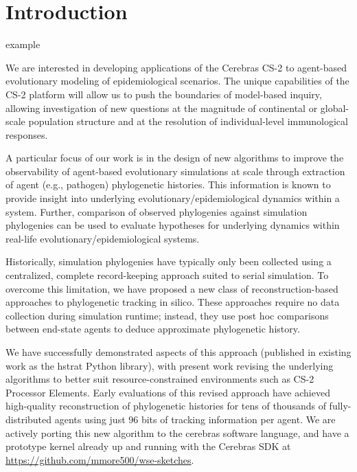 \section{Introduction} \label{sec:introduction}

example \citep{gagliardi2019international}




We are interested in developing applications of the Cerebras CS-2 to agent-based evolutionary modeling of epidemiological scenarios.
The unique capabilities of the CS-2 platform will allow us to push the boundaries of model-based inquiry, allowing investigation of new questions at the magnitude of continental or global-scale population structure and at the resolution of individual-level immunological responses.

A particular focus of our work is in the design of new algorithms to improve the observability of agent-based evolutionary simulations at scale through extraction of agent (e.g., pathogen) phylogenetic histories.
This information is known to provide insight into underlying evolutionary/epidemiological dynamics within a system.
Further, comparison of observed phylogenies against simulation phylogenies can be used to evaluate hypotheses for underlying dynamics within real-life evolutionary/epidemiological systems.

Historically, simulation phylogenies have typically only been collected using a centralized, complete record-keeping approach suited to serial simulation.
To overcome this limitation, we have proposed a new class of reconstruction-based approaches to phylogenetic tracking in silico.
These approaches require no data collection during simulation runtime; instead, they use post hoc comparisons between end-state agents to deduce approximate phylogenetic history.

We have successfully demonstrated aspects of this approach (published in existing work as the hstrat Python library), with present work revising the underlying algorithms to better suit resource-constrained environments such as CS-2 Processor Elements.
Early evaluations of this revised approach have achieved high-quality reconstruction of phylogenetic histories for tens of thousands of fully-distributed agents using just 96 bits of tracking information per agent.
We are actively porting this new algorithm to the cerebras software language, and have a prototype kernel already up and running with the Cerebras SDK at \url{https://github.com/mmore500/wse-sketches}.


